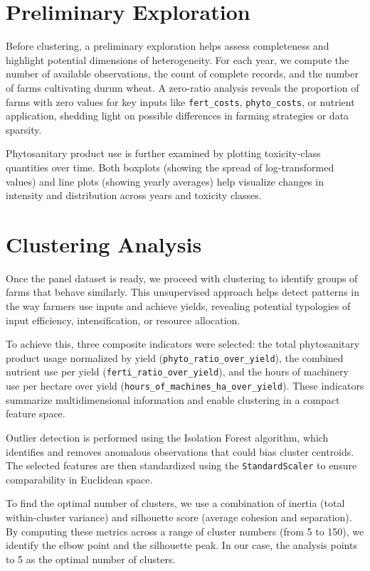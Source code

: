 \documentclass[a4paper,12pt]{article}
\begin{document}
\section{Preliminary Exploration}

Before clustering, a preliminary exploration helps assess completeness and highlight potential dimensions of heterogeneity. For each year, we compute the number of available observations, the count of complete records, and the number of farms cultivating durum wheat. A zero-ratio analysis reveals the proportion of farms with zero values for key inputs like \texttt{fert\_costs}, \texttt{phyto\_costs}, or nutrient application, shedding light on possible differences in farming strategies or data sparsity.

Phytosanitary product use is further examined by plotting toxicity-class quantities over time. Both boxplots (showing the spread of log-transformed values) and line plots (showing yearly averages) help visualize changes in intensity and distribution across years and toxicity classes.

\section{Clustering Analysis}

Once the panel dataset is ready, we proceed with clustering to identify groups of farms that behave similarly. This unsupervised approach helps detect patterns in the way farmers use inputs and achieve yields, revealing potential typologies of input efficiency, intensification, or resource allocation.

To achieve this, three composite indicators were selected: the total phytosanitary product usage normalized by yield (\texttt{phyto\_ratio\_over\_yield}), the combined nutrient use per yield (\texttt{ferti\_ratio\_over\_yield}), and the hours of machinery use per hectare over yield (\texttt{hours\_of\_machines\_ha\_over\_yield}). These indicators summarize multidimensional information and enable clustering in a compact feature space.

Outlier detection is performed using the Isolation Forest algorithm, which identifies and removes anomalous observations that could bias cluster centroids. The selected features are then standardized using the \texttt{StandardScaler} to ensure comparability in Euclidean space.

To find the optimal number of clusters, we use a combination of inertia (total within-cluster variance) and silhouette score (average cohesion and separation). By computing these metrics across a range of cluster numbers (from 5 to 150), we identify the elbow point and the silhouette peak. In our case, the analysis points to 5 as the optimal number of clusters.
\end{document}
